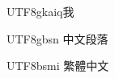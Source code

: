 \documentclass[12pt,a4paper]{article}
\newcommand{\ch}[1]{\begin{CJK}{UTF8}{gkai}#1\end{CJK}}
\begin{document}
\ch{q我}

\begin{CJK*}{UTF8}{gbsn}
中文段落  
\end{CJK*}

\begin{CJK*}{UTF8}{bsmi}
繁體中文  
\end{CJK*}
\end{document}
